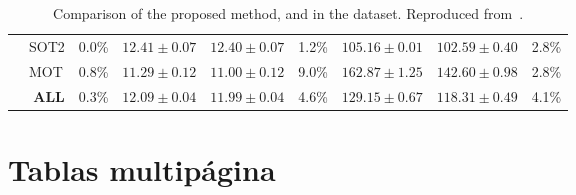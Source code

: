 \begin{table}[h]
{\begin{tabular}{cl|ccc|ccc|c}
      \multicolumn{1}{|c|}{}                                                   & SOT2                                                  & \multicolumn{1}{c|}{0.0\%}                                                        & \multicolumn{1}{c|}{$12.41\pm0.07$}                                                 & $12.40\pm0.07$                                                 & \multicolumn{1}{c|}{1.2\%}                                                        & \multicolumn{1}{c|}{$105.16\pm0.01$}                                                & $102.59\pm0.40$                                                & \multicolumn{1}{c|}{2.8\%}                                                          \\ \cline{2-9}
      \multicolumn{1}{|c|}{}                                                   & MOT                                                   & \multicolumn{1}{c|}{0.8\%}                                                        & \multicolumn{1}{c|}{$11.29\pm0.12$}                                                 & $11.00\pm0.12$                                                 & \multicolumn{1}{c|}{9.0\%}                                                        & \multicolumn{1}{c|}{$162.87\pm1.25$}                                                & $142.60\pm0.98$                                                & \multicolumn{1}{c|}{2.8\%}                                                          \\ \cline{2-9}
      \multicolumn{1}{|c|}{\multirow{-4}{*}{\AVThreeTVLoc{}}} & \multicolumn{1}{r|}{\textbf{ALL}}                              & \multicolumn{1}{c|}{0.3\%}                                                        & \multicolumn{1}{c|}{$12.09\pm0.04$}                                                 & $11.99\pm0.04$                                                 & \multicolumn{1}{c|}{4.6\%}                                                        & \multicolumn{1}{c|}{$129.15\pm0.67$}                                                & $118.31\pm0.49$                                                & \multicolumn{1}{c|}{4.1\%}                                                          \\ \hline
    \end{tabular}
  }
  \caption{Comparison of the proposed \LandPoseVLoc{} method, and \AVThreeTVLoc{} in the \CAVDB{} dataset. Reproduced from~\cite{Sanabria2026Landmark}.}
  \label{tab:MethodSummaryCAV3D}
\end{table}


\section{Tablas multipágina}
\label{sec:tablas-multipagina}

